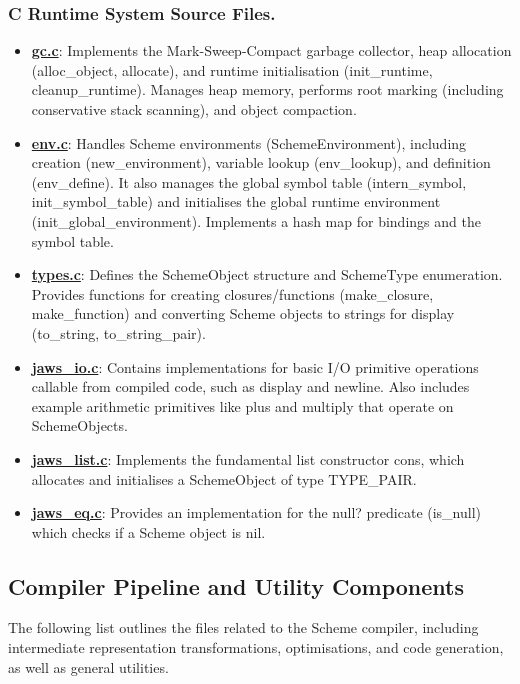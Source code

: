 \documentclass[final]{cmpreport_02}
\begin{document}
\subsubsection*{C Runtime System Source Files.}
\label{tab:jaws-runtime-files}
\begin{itemize}
\item \textbf{\href{https://github.com/jamie-wales/Jaws/blob/main/src/gc.c}{gc.c}}: Implements the Mark-Sweep-Compact garbage collector, heap allocation (alloc\_object, allocate), and runtime initialisation (init\_runtime, cleanup\_runtime). Manages heap memory, performs root marking (including conservative stack scanning), and object compaction.
\item \textbf{\href{https://github.com/jamie-wales/Jaws/blob/main/src/env.c}{env.c}}: Handles Scheme environments (SchemeEnvironment), including creation (new\_environment), variable lookup (env\_lookup), and definition (env\_define). It also manages the global symbol table (intern\_symbol, init\_symbol\_table) and initialises the global runtime environment (init\_global\_environment). Implements a hash map for bindings and the symbol table.
\item \textbf{\href{https://github.com/jamie-wales/Jaws/blob/main/src/types.c}{types.c}}: Defines the SchemeObject structure and SchemeType enumeration. Provides functions for creating closures/functions (make\_closure, make\_function) and converting Scheme objects to strings for display (to\_string, to\_string\_pair).
\item \textbf{\href{https://github.com/jamie-wales/Jaws/blob/main/src/jaws_io.c}{jaws\_io.c}}: Contains implementations for basic I/O primitive operations callable from compiled code, such as display and newline. Also includes example arithmetic primitives like plus and multiply that operate on SchemeObjects.
\item \textbf{\href{https://github.com/jamie-wales/Jaws/blob/main/src/jaws_list.c}{jaws\_list.c}}: Implements the fundamental list constructor cons, which allocates and initialises a SchemeObject of type TYPE\_PAIR.
\item \textbf{\href{https://github.com/jamie-wales/Jaws/blob/main/src/jaws_eq.c}{jaws\_eq.c}}: Provides an implementation for the null? predicate (is\_null) which checks if a Scheme object is nil.
\end{itemize}
\subsection{Compiler Pipeline and Utility Components}
The following list outlines the files related to the Scheme compiler, including intermediate representation transformations, optimisations, and code generation, as well as general utilities. 
\end{document}
